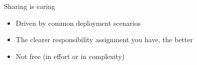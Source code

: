 \documentclass[black,white,aspectratio=169]{beamer}
\DeclareRobustCommand{\#}{\adjustbox{valign=B,totalheight=.57\baselineskip}{\oldhash}}%
\begin{document}
    \begin{frame}{Sharing is caring}
        \begin{itemize}
            \item Driven by common deployment scenarios~\medskip
            \item The clearer responsibility assignment you have, the better~\medskip
            \item Not free (in effort or in complexity)~\medskip

        \end{itemize}
    \end{frame}
\end{document}
